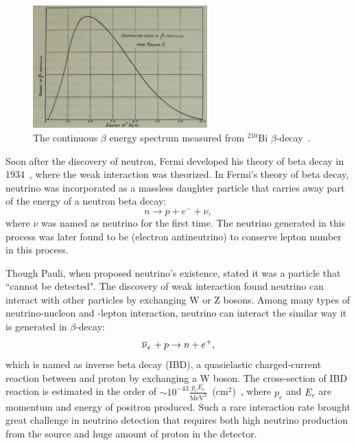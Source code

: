 \begin{figure}[h!]
\centering
\includegraphics[width=0.6\textwidth]{Figures/BiSpectrum.png}
\caption[Continuous beta spectrum]{The continuous $\beta$ energy spectrum measured from $^{210}$Bi $\beta$-decay~\cite{bib:EandW}.}
\label{fig:BiSpectrum}
\end{figure}    
    
    Soon after the discovery of neutron, Fermi developed his theory of beta decay in 1934~\cite{bib:Fermi}, where the weak interaction was theorized. 
    In Fermi's theory of beta decay, neutrino was incorporated as a massless daughter particle that carries away part of the energy of a neutron beta decay:
    \begin{equation}\label{eq1.1}
        n \rightarrow p + e^- + \nu,
    \end{equation}
    where $\nu$ was named as neutrino for the first time.
    The neutrino generated in this process was later found to be \nuebar (electron antineutrino) to conserve lepton number in this process.

\label{Ch1Sec2}

    Though Pauli, when proposed neutrino's existence, stated it was a particle that ``cannot be detected".
    The discovery of weak interaction found neutrino can interact with other particles by exchanging W or Z bosons.
    Among many types of neutrino-nucleon and -lepton interaction, neutrino can interact the similar way it is generated in $\beta$-decay:
    \begin{equation}
        \label{eq:IBD}
        \overline{\nu }_{e}\hspace{1pt} + p \rightarrow n + e^+,
    \end{equation}
    which is named as inverse beta decay (IBD), a quasielastic charged-current reaction between \nuebar and proton by exchanging a W boson.
    The cross-section of IBD reaction is estimated in the order of $\sim 10^{-43}\frac{p_eE_e}{\text{MeV}^2}$~(cm$^2$)~\cite{bib:IBDXsection}, where $p_e$ and $E_e$ are momentum and energy of positron produced.
    Such a rare interaction rate brought great challenge in neutrino detection that requires both high neutrino production from the source and huge amount of proton in the detector.
    

